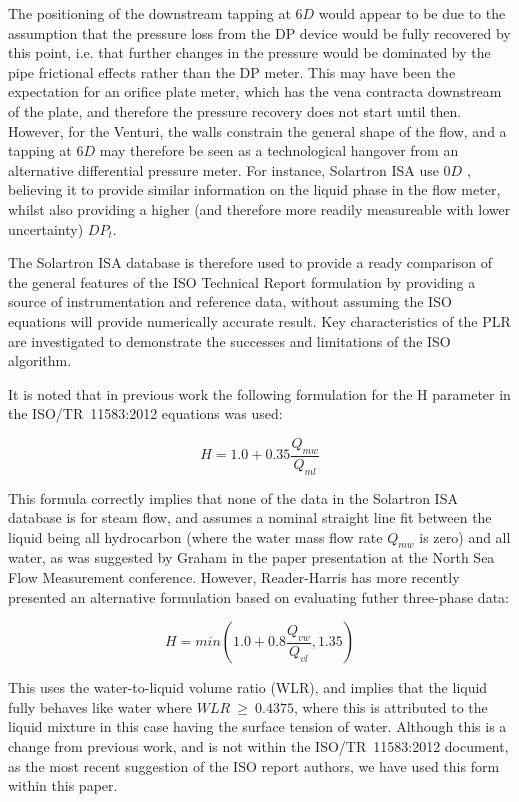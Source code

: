 \documentclass[journal]{IEEEtran}
\begin{document}
The positioning of the downstream tapping at $6D$ would appear to be due to the assumption that the pressure loss from the DP device would be fully recovered by this point, i.e. that further changes in the pressure would be dominated by the pipe frictional effects rather than the DP meter.  This may have been the expectation for an orifice plate meter, which has the vena contracta downstream of the plate, and therefore the pressure recovery does not start until then.  However, for the Venturi, the walls constrain the general shape of the flow, and a tapping at $6D$ may therefore be seen as a technological hangover from an alternative differential pressure meter.  For instance, Solartron ISA use $0D$ \cite{Collins2017PLR1}, believing it to provide similar information on the liquid phase in the flow meter, whilst also providing a higher (and therefore more readily measureable with lower uncertainty) $DP_{t}$.

The Solartron ISA database is therefore used to provide a ready comparison of the general features of the ISO Technical Report formulation by providing a source of instrumentation and reference data, without assuming the ISO equations will provide numerically accurate result.  Key characteristics of the PLR are investigated to demonstrate the successes and limitations of the ISO algorithm.

It is noted that in previous work \cite{Collins2015} the following formulation for the \acrshort{H} parameter in the ISO/TR~11583:2012 \cite{2012ISO/TRConduits} equations was used:

\begin{equation}
H = 1.0 + 0.35 \frac{Q_{mw}}{Q_{ml}}    
\end{equation}

This formula correctly implies that none of the data in the Solartron ISA database is for steam flow, and assumes a nominal straight line fit between the liquid being all hydrocarbon (where the water mass flow rate $Q_{mw}$ is zero) and all water, as was suggested by Graham in the paper presentation at the North Sea Flow Measurement conference.  However, Reader-Harris has more recently presented an alternative formulation \cite{Reader-Harris2017} based on evaluating futher three-phase data:

\begin{equation}
H = min \left( 1.0 + 0.8 \frac{Q_{vw}}{Q_{vl}}, 1.35 \right)    
\end{equation}

This uses the water-to-liquid volume ratio (WLR), and implies that the liquid fully behaves like water where $WLR~\geq~0.4375$, where this is attributed to the liquid mixture in this case having the surface tension of water.  Although this is a change from previous work, and is not within the ISO/TR~11583:2012 document, as the most recent suggestion of the ISO report authors, we have used this form within this paper.
\end{document}
